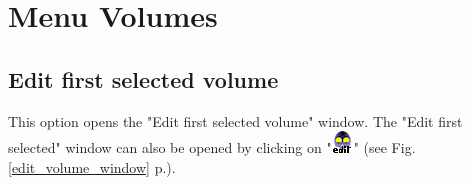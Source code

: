 
\chapter{Menu Volumes}\label{volumes_chapter}
\minitoc 

\section{Edit first selected volume}
This option opens the "Edit first selected volume" window.
The "Edit first selected" window can also be opened by clicking on "\includegraphics[scale=0.7]{images/06/objects/volume_edit.png}" (see Fig. \ref{edit_volume_window} p.\pageref{edit_volume_window}).



